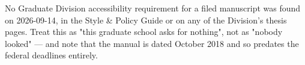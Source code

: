 %

%
%

%
	{No Graduate Division accessibility requirement for a filed manuscript was
	 found on 2026-09-14, in the Style \& Policy Guide or on any of the
	 Division's thesis pages. Treat this as "this graduate school asks for
	 nothing", not as "nobody looked" — and note that the manual is dated
	 October 2018 and so predates the federal deadlines entirely.}

